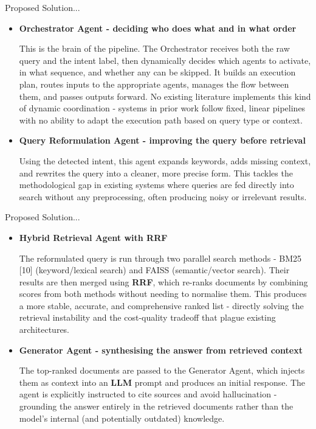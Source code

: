 \begin{frame}{Proposed Solution...}
    \begin{itemize}
        \item \textbf{Orchestrator Agent - deciding who does what and in what order}

        This is the brain of the pipeline. The Orchestrator receives both the raw query and the intent label, then dynamically decides which agents to activate, in what sequence, and whether any can be skipped. It builds an execution plan, routes inputs to the appropriate agents, manages the flow between them, and passes outputs forward. No existing literature implements this kind of dynamic coordination - systems in prior work follow fixed, linear pipelines with no ability to adapt the execution path based on query type or context.

        
         \item \textbf{Query Reformulation Agent - improving the query before retrieval}
         
            Using the detected intent, this agent expands keywords, adds missing context, and rewrites the query into a cleaner, more precise form. This tackles the methodological gap in existing systems where queries are fed directly into search without any preprocessing, often producing noisy or irrelevant results.

        

    \end{itemize}
\end{frame}

\begin{frame}{Proposed Solution...}
    \begin{itemize}
        \item \textbf{Hybrid Retrieval Agent with RRF}
        
        The reformulated query is run through two parallel search methods - BM25 [10] (keyword/lexical search) and FAISS (semantic/vector search). Their results are then merged using \textbf{RRF}, which re-ranks documents by combining scores from both methods without needing to normalise them. This produces a more stable, accurate, and comprehensive ranked list - directly solving the retrieval instability and the cost-quality tradeoff that plague existing architectures.
    
         \item \textbf{Generator Agent - synthesising the answer from retrieved context}
         
            The top-ranked documents are passed to the Generator Agent, which injects them as context into an \textbf{LLM} prompt and produces an initial response. The agent is explicitly instructed to cite sources and avoid hallucination - grounding the answer entirely in the retrieved documents rather than the model's internal (and potentially outdated) knowledge.


    \end{itemize}
\end{frame}

